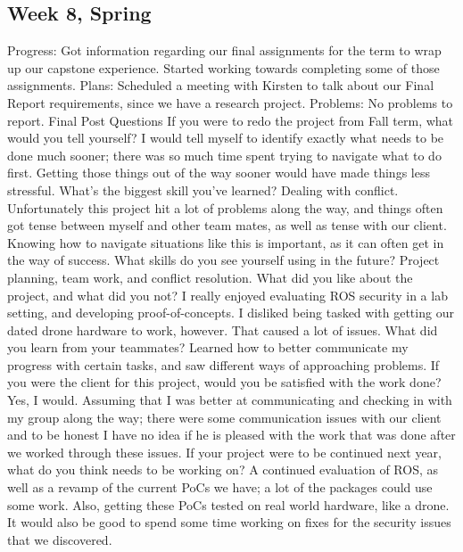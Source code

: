 \subsection{Week 8, Spring}
Progress: Got information regarding our final assignments for the term to wrap up our capstone experience. Started working towards completing some of those assignments.
Plans: Scheduled a meeting with Kirsten to talk about our Final Report requirements, since we have a research project.
Problems: No problems to report.
Final Post Questions
If you were to redo the project from Fall term, what would you tell yourself? I would tell myself to identify exactly what needs to be done much sooner; there was so much time spent trying to navigate what to do first. Getting those things out of the way sooner would have made things less stressful.
What's the biggest skill you've learned? Dealing with conflict. Unfortunately this project hit a lot of problems along the way, and things often got tense between myself and other team mates, as well as tense with our client. Knowing how to navigate situations like this is important, as it can often get in the way of success.
What skills do you see yourself using in the future? Project planning, team work, and conflict resolution.
What did you like about the project, and what did you not? I really enjoyed evaluating ROS security in a lab setting, and developing proof-of-concepts. I disliked being tasked with getting our dated drone hardware to work, however. That caused a lot of issues.
What did you learn from your teammates? Learned how to better communicate my progress with certain tasks, and saw different ways of approaching problems.
If you were the client for this project, would you be satisfied with the work done? Yes, I would. Assuming that I was better at communicating and checking in with my group along the way; there were some communication issues with our client and to be honest I have no idea if he is pleased with the work that was done after we worked through these issues.
If your project were to be continued next year, what do you think needs to be working on? A continued evaluation of ROS, as well as a revamp of the current PoCs we have; a lot of the packages could use some work. Also, getting these PoCs tested on real world hardware, like a drone. It would also be good to spend some time working on fixes for the security issues that we discovered.

